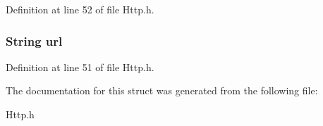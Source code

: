 Definition at line 52 of file Http.\-h.

\hypertarget{structHttpExtends_a983d3a00cb7e2cdac046d6ef1ce9f8f2}{
\subsubsection[{url}]{\setlength{\rightskip}{0pt plus 5cm}String url}}\label{structHttpExtends_a983d3a00cb7e2cdac046d6ef1ce9f8f2}


Definition at line 51 of file Http.\-h.



The documentation for this struct was generated from the following file\-:\begin{DoxyCompactItemize}
\item 
Http.\-h\end{DoxyCompactItemize}
